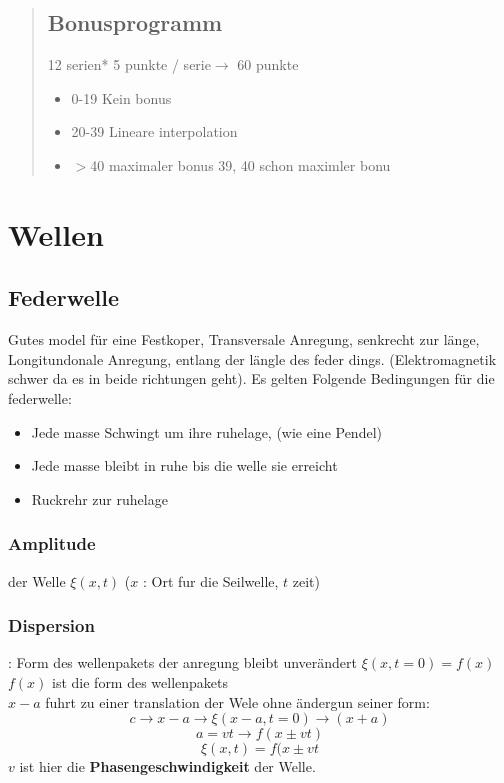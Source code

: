 \documentclass{article}
\author{Benjamin Dropmann}
\begin{document}
\begin{abstract}
\subsection{Bonusprogramm}
12 serien* 5 punkte / serie$\rightarrow$ 60 punkte\begin{itemize}
\item[\textbullet]{0-19 Kein bonus}
\item[\textbullet]{20-39 Lineare interpolation}
\item[\textbullet]{$>$40 maximaler bonus 39, 40 schon maximler bonu}
\end{itemize}
\end{abstract}
\section{Wellen}
\subsection{Federwelle} Gutes model für eine Festkoper, Transversale Anregung, senkrecht zur länge, Longitundonale Anregung, entlang der  längle des feder dings. (Elektromagnetik schwer da es in beide richtungen geht). Es gelten Folgende Bedingungen für die federwelle:
\begin{itemize}
\item[\textbullet]Jede masse Schwingt um ihre ruhelage, (wie eine Pendel)
\item[\textbullet]Jede masse bleibt in ruhe bis die welle sie erreicht
\item[\textbullet]Ruckrehr zur ruhelage
\end{itemize}
\subsubsection{Amplitude} der Welle $\xi(x,t)$ ($x$ : Ort fur die Seilwelle, $t$ zeit)
\subsubsection{Dispersion}: Form des wellenpakets der anregung bleibt unverändert
$\xi(x,t=0)=f(x)$ $f(x)$ ist die form des wellenpakets\\$x-a$ fuhrt zu einer translation der Wele ohne ändergun seiner form:
\[c\rightarrow x-a\rightarrow \xi(x-a,t=0)\rightarrow (x+a)\]
\[a=vt \rightarrow f(x\pm vt)\]
\[\xi(x,t)=f(x\pm vt\] $v$ ist hier die \textbf{Phasengeschwindigkeit} der Welle.
\end{document}
